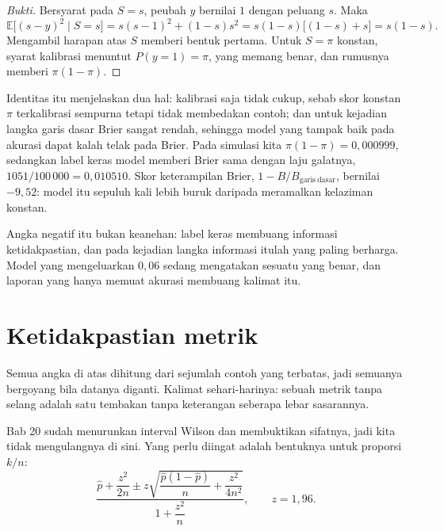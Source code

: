 \begin{proof}[Bukti]
Bersyarat pada $S=s$, peubah $y$ bernilai $1$ dengan peluang $s$. Maka
\[
\mathbb{E}\bigl[(s-y)^2\mid S=s\bigr]
=s(s-1)^2+(1-s)s^2=s(1-s)\bigl[(1-s)+s\bigr]=s(1-s).
\]
Mengambil harapan atas $S$ memberi bentuk pertama. Untuk $S=\pi$ konstan, syarat
kalibrasi menuntut $P(y=1)=\pi$, yang memang benar, dan rumusnya memberi $\pi(1-\pi)$.
\end{proof}

Identitas itu menjelaskan dua hal: kalibrasi saja tidak cukup, sebab skor konstan $\pi$
terkalibrasi sempurna tetapi tidak membedakan contoh; dan untuk kejadian langka garis
dasar Brier sangat rendah, sehingga model yang tampak baik pada akurasi dapat kalah telak
pada Brier. Pada simulasi kita $\pi(1-\pi)=0{,}000999$, sedangkan label keras model memberi
Brier sama dengan laju galatnya, $1051/100\,000=0{,}010510$. Skor keterampilan Brier,
$1-B/B_{\mathrm{garis\ dasar}}$, bernilai $-9{,}52$: model itu sepuluh kali lebih buruk
daripada meramalkan kelaziman konstan.

Angka negatif itu bukan keanehan: label keras membuang informasi ketidakpastian, dan pada
kejadian langka informasi itulah yang paling berharga. Model yang mengeluarkan $0{,}06$
sedang mengatakan sesuatu yang benar, dan laporan yang hanya memuat akurasi membuang
kalimat itu.

\section{Ketidakpastian metrik}

Semua angka di atas dihitung dari sejumlah contoh yang terbatas, jadi semuanya bergoyang
bila datanya diganti. Kalimat sehari-harinya: sebuah metrik tanpa selang adalah satu
tembakan tanpa keterangan seberapa lebar sasarannya.

Bab 20 sudah menurunkan interval Wilson dan membuktikan sifatnya, jadi kita tidak
mengulangnya di sini. Yang perlu diingat adalah bentuknya untuk proporsi $k/n$:
\[
\frac{\hat p+\dfrac{z^2}{2n}\pm
z\sqrt{\dfrac{\hat p(1-\hat p)}{n}+\dfrac{z^2}{4n^2}}}{1+\dfrac{z^2}{n}},
\qquad z=1{,}96 .
\]

